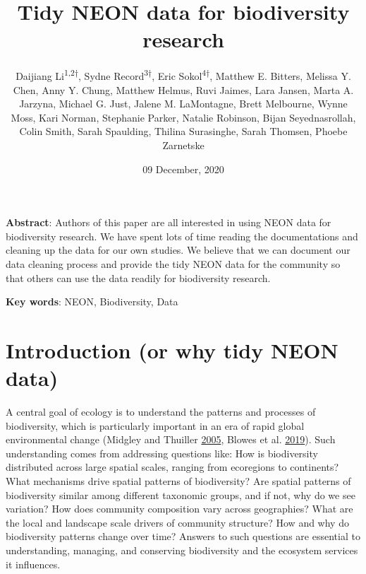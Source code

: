 \documentclass[
  12pt,
]{article}
\title{Tidy NEON data for biodiversity research}
\author{Daijiang Li\textsuperscript{1,2†}, Sydne Record\textsuperscript{3†}, Eric Sokol\textsuperscript{4†}, Matthew E. Bitters, Melissa Y. Chen, Anny Y. Chung, Matthew Helmus, Ruvi Jaimes, Lara Jansen, Marta A. Jarzyna, Michael G. Just, Jalene M. LaMontagne, Brett Melbourne, Wynne Moss, Kari Norman, Stephanie Parker, Natalie Robinson, Bijan Seyednasrollah, Colin Smith, Sarah Spaulding, Thilina Surasinghe, Sarah Thomsen, Phoebe Zarnetske}
\date{09 December, 2020}
\makeatletter
\newcommand\iraggedright{%
  \let\\\@centercr\@rightskip\@flushglue \rightskip\@rightskip
  \leftskip\z@skip}
\makeatother
\begin{document}
\maketitle

\iraggedright

\textbf{Abstract}: Authors of this paper are all interested in using NEON data for biodiversity research. We have spent lots of time reading the documentations and cleaning up the data for our own studies. We believe that we can document our data cleaning process and provide the tidy NEON data for the community so that others can use the data readily for biodiversity research.

\textbf{Key words}: NEON, Biodiversity, Data

\hypertarget{introduction-or-why-tidy-neon-data}{%
\section{Introduction (or why tidy NEON data)}\label{introduction-or-why-tidy-neon-data}}

A central goal of ecology is to understand the patterns and processes of biodiversity, which is particularly important in an era of rapid global environmental change (Midgley and Thuiller \protect\hyperlink{ref-midgley2005global}{2005}, Blowes et al. \protect\hyperlink{ref-blowes2019geography}{2019}). Such understanding comes from addressing questions like: How is biodiversity distributed across large spatial scales, ranging from ecoregions to continents? What mechanisms drive spatial patterns of biodiversity? Are spatial patterns of biodiversity similar among different taxonomic groups, and if not, why do we see variation? How does community composition vary across geographies? What are the local and landscape scale drivers of community structure? How and why do biodiversity patterns change over time? Answers to such questions are essential to understanding, managing, and conserving biodiversity and the ecosystem services it influences.
\end{document}
